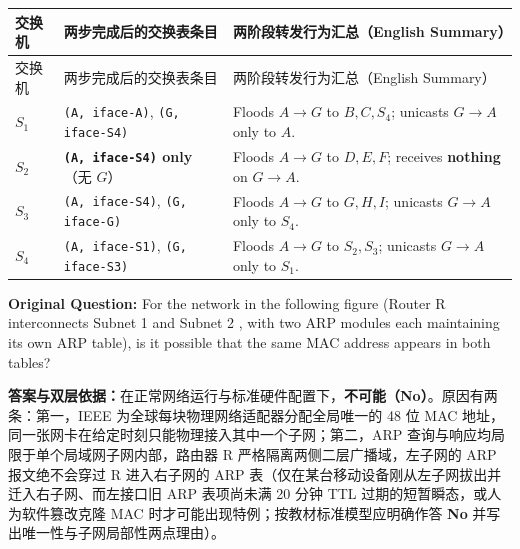 \begingroup\small\setlength{\tabcolsep}{3pt}\renewcommand{\arraystretch}{1.20}
\begin{longtable}{@{}>{\raggedright\arraybackslash}p{}>{\raggedright\arraybackslash}p{}>{\raggedright\arraybackslash}p{}@{}}
\toprule
交换机 & 两步完成后的交换表条目 & 两阶段转发行为汇总（English Summary） \\
\midrule\endfirsthead
交换机 & 两步完成后的交换表条目 & 两阶段转发行为汇总（English Summary） \\
\midrule\endhead
\bottomrule\endfoot
\textbf{$S_1$} & \texttt{(A, iface-A)}, \texttt{(G, iface-S4)} & Floods $A\to G$ to $B, C, S_4$; unicasts $G\to A$ only to $A$. \\
\textbf{$S_2$} & \textbf{\texttt{(A, iface-S4)} only}（无 $G$） & Floods $A\to G$ to $D, E, F$; receives \textbf{nothing} on $G\to A$. \\
\textbf{$S_3$} & \texttt{(A, iface-S4)}, \texttt{(G, iface-G)} & Floods $A\to G$ to $G, H, I$; unicasts $G\to A$ only to $S_4$. \\
\textbf{$S_4$} & \texttt{(A, iface-S1)}, \texttt{(G, iface-S3)} & Floods $A\to G$ to $S_2, S_3$; unicasts $G\to A$ only to $S_1$. \\
\end{longtable}\endgroup



\textbf{Original Question:} For the network in the following figure (Router R interconnects Subnet 1  and Subnet 2 , with two ARP modules each maintaining its own ARP table), is it possible that the same MAC address appears in both tables?


\textbf{答案与双层依据：}在正常网络运行与标准硬件配置下，\textbf{不可能（No）}。原因有两条：第一，IEEE 为全球每块物理网络适配器分配全局唯一的 48 位 MAC 地址，同一张网卡在给定时刻只能物理接入其中一个子网；第二，ARP 查询与响应均局限于单个局域网子网内部，路由器 R 严格隔离两侧二层广播域，左子网的 ARP 报文绝不会穿过 R 进入右子网的 ARP 表（仅在某台移动设备刚从左子网拔出并迁入右子网、而左接口旧 ARP 表项尚未满 20 分钟 TTL 过期的短暂瞬态，或人为软件篡改克隆 MAC 时才可能出现特例；按教材标准模型应明确作答 \textbf{No} 并写出唯一性与子网局部性两点理由）。

